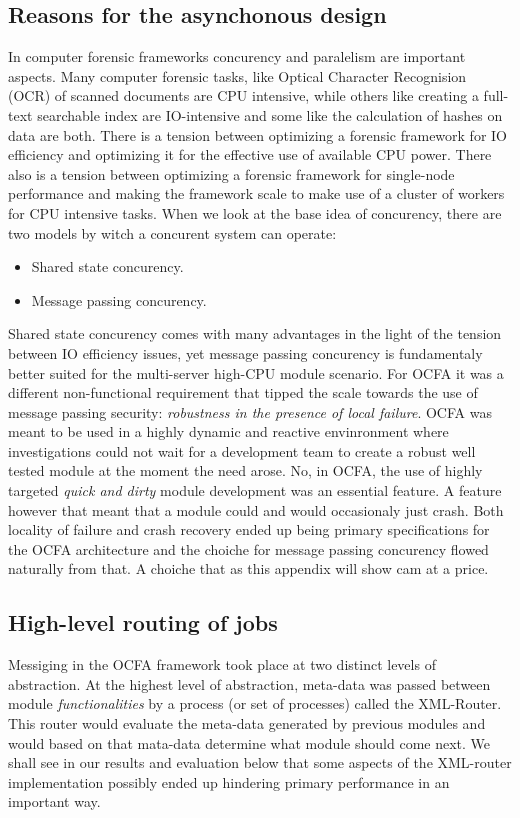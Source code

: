 \subsection{Reasons for the asynchonous design}
In computer forensic frameworks concurency and paralelism are important aspects. Many computer forensic tasks, like Optical Character Recognision (OCR) of scanned documents are CPU intensive, while others like creating a full-text searchable index are IO-intensive and some like the calculation of hashes on data are both. There is a tension between optimizing a forensic framework for IO efficiency and optimizing it for the effective use of available CPU power. There also is a tension between optimizing a forensic framework for single-node performance and making the framework scale to make use of a cluster of workers for CPU intensive tasks. When we look at the base idea of concurency, there are two models by witch a concurent system can operate: 
\begin{itemize}
\item Shared state concurency.
\item Message passing concurency.
\end{itemize}
Shared state concurency comes with many advantages in the light of the tension between IO efficiency issues, yet message passing concurency is fundamentaly better suited for the multi-server high-CPU module scenario. For OCFA it was a different non-functional requirement that tipped the scale towards the use of message passing security: \emph{robustness in the presence of local failure}. OCFA was meant to be used in
a highly dynamic and reactive envinronment where investigations could not wait for a development team to create a robust well tested module at the moment the need arose. No, in OCFA, the use of highly targeted \emph{quick and dirty} module development was an essential feature. A feature however that meant that a module could and would occasionaly just crash. Both locality of failure and crash recovery ended up being primary specifications for the OCFA architecture and the choiche for message passing concurency flowed naturally from that. A choiche that as this appendix will show cam at a price.
\subsection{High-level routing of jobs}
Messiging in the OCFA framework took place at two distinct levels of abstraction. At the highest level of abstraction, meta-data was passed between module \emph{functionalities} by a process (or set of processes) called the XML-Router. This router would evaluate the meta-data generated by previous modules and would based on that mata-data determine what module should come next. We shall see in our results and evaluation below that some aspects of the XML-router implementation possibly ended up hindering primary performance in an important way.
